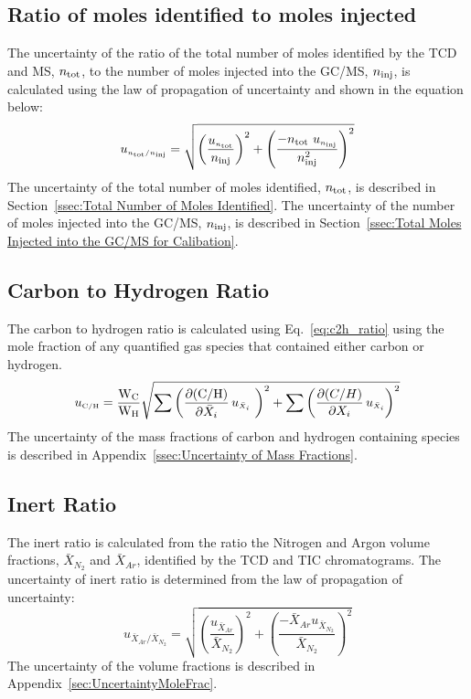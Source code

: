 \documentclass[12pt]{article}
\begin{document}
\subsection{Ratio of moles identified to moles injected }
\label{ssec:mole ratio}
The uncertainty of the ratio of the total number of moles identified by the TCD and MS, $n_{\rm tot}$, to the number of moles injected into the GC/MS, $n_{\rm inj}$, is calculated using the law of propagation of uncertainty and shown in the equation below:
\begin{equation}
\label{eq:mol_ratio_uncertainty}
u_{\scriptscriptstyle n_{\rm tot}/n_{\rm inj}} = \sqrt{\left(\frac{u_{\scriptscriptstyle n_{\rm tot}}}{n_{\rm inj}}\right)^2 + \left(\frac{-n_{\rm tot}~u_{\scriptscriptstyle n_{\rm inj}}}{{n_{\rm inj}^2}}\right)^2}
\end{equation}
The uncertainty of the total number of moles identified, $n_{\rm tot}$, is described in Section~\ref{ssec:Total Number of Moles Identified}. The uncertainty of the number of moles injected into the GC/MS, $n_{\rm inj}$, is described in Section~\ref{ssec:Total Moles Injected into the GC/MS for Calibation}.

\subsection{Carbon to Hydrogen Ratio}
\label{ssec:C2H_ratio}
The carbon to hydrogen ratio is calculated using Eq.~\ref{eq:c2h_ratio} using the mole fraction of any quantified gas species that contained either carbon or hydrogen.
\begin{equation}
\label{eq:c2h_uncertainty}
u_{\scriptscriptstyle {\rm C}/{\rm H}} =\frac{\textrm{W}_{\rm{C}}}{\textrm{W}_{\rm{H}}} \sqrt{{\sum\left(\frac{\partial ({\rm C}/{\rm H})}{\partial \bar{X}_{i}}\,u_{\scriptscriptstyle \bar{X}_{i}}~ \right)}^2+{\sum\left(\frac{\partial ({C}/{H})}{\partial X_{i}}\,u_{\scriptscriptstyle \bar{X}_{i}}\right)}^2}
\end{equation}
The uncertainty of the mass fractions of carbon and hydrogen containing species is described in Appendix~\ref{ssec:Uncertainty of Mass Fractions}.

\subsection{Inert Ratio}
\label{ssec:Inert_ratio}
The inert ratio is calculated from the ratio the Nitrogen and Argon volume fractions, $\bar{X}_{N_2}$ and $\bar{X}_{Ar}$, identified by the TCD and TIC chromatograms. The uncertainty of inert ratio is determined from the law of propagation of uncertainty:
\begin{equation}
\label{eq:inert_ratio_uncertainty}
u_{\scriptscriptstyle \bar{X}_{Ar}/\bar{X}_{N_2}} = \sqrt{{\left(\frac{u_{\scriptscriptstyle \bar{X}_{Ar}}}{\bar{X}_{N_2}}\right)}^2+{\left(\frac{-\bar{X}_{Ar}u_{\scriptscriptstyle \bar{X}_{N_2}}}{\bar{X}_{N_2}}\right)}^2}
\end{equation}
The uncertainty of the volume fractions is described in Appendix~\ref{sec:UncertaintyMoleFrac}.
\end{document}
